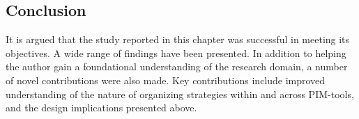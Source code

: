 


\subsection{Conclusion}
\label{exp-study:discussion:conclusion}

It is argued that the study reported in this chapter was successful in meeting its objectives.  A wide range of findings have been presented. In addition to helping the author gain a foundational understanding of the research domain, a number of novel contributions were also made.  Key contributions include improved understanding of the nature of organizing strategies within and across PIM-tools, and the design implications presented above.  %

